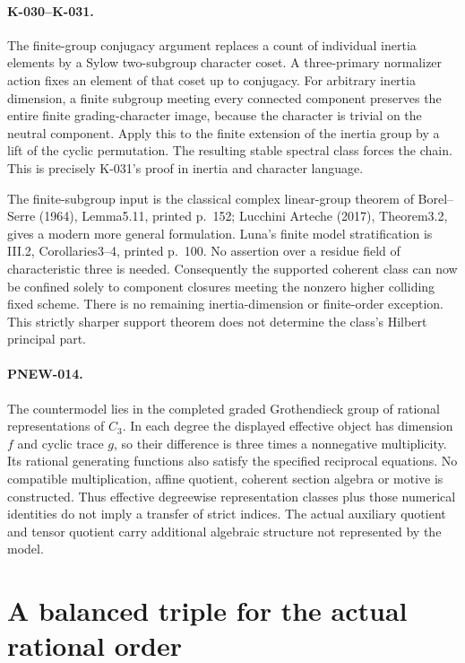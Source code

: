 \paragraph{K-030--K-031.}
The finite-group conjugacy argument replaces a count of individual
inertia elements by a Sylow two-subgroup character coset. A three-primary
normalizer action fixes an element of that coset up to conjugacy.
For arbitrary inertia dimension, a finite subgroup meeting every
connected component preserves the entire finite grading-character image,
because the character is trivial on the neutral component. Apply this
to the finite extension of the inertia group by a lift of the cyclic
permutation. The resulting stable spectral class forces the chain.
This is precisely K-031's proof in inertia and character language.

The finite-subgroup input is the classical complex linear-group theorem
of Borel--Serre (1964), Lemma5.11, printed p.~152; Lucchini Arteche
(2017), Theorem3.2, gives a modern more general formulation. Luna's
finite model stratification is III.2, Corollaries3--4, printed p.~100.
No assertion over a residue field of characteristic three is needed.
Consequently the supported coherent class can now be confined solely
to component closures meeting the nonzero higher colliding fixed scheme.
There is no remaining inertia-dimension or finite-order exception.
This strictly sharper support theorem does not determine the class's
Hilbert principal part.

\paragraph{PNEW-014.}
The countermodel lies in the completed graded Grothendieck group of
rational representations of $C_3$. In each degree the displayed
effective object has dimension $f$ and cyclic trace $g$, so their
difference is three times a nonnegative multiplicity. Its rational
generating functions also satisfy the specified reciprocal equations.
No compatible multiplication, affine quotient, coherent section algebra
or motive is constructed. Thus effective degreewise representation
classes plus those numerical identities do not imply a transfer of
strict indices. The actual auxiliary quotient and tensor quotient carry
additional algebraic structure not represented by the model.

\section{A balanced triple for the actual rational order}
